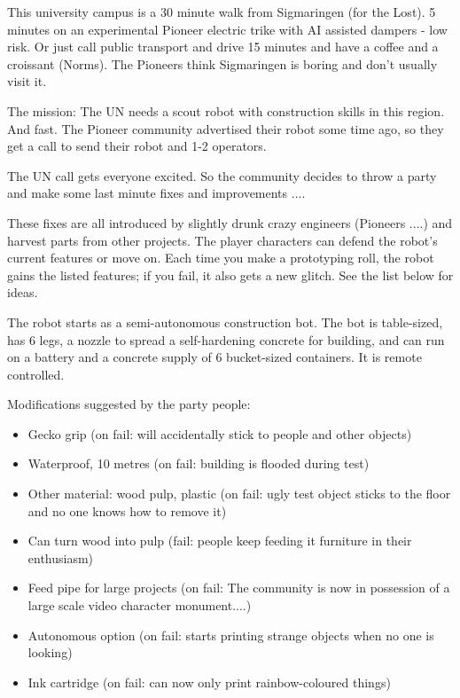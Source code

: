 This university campus is a 30 minute walk from Sigmaringen (for the Lost). 5 minutes on an experimental Pioneer electric trike with AI assisted dampers - low risk. Or just call public transport and drive 15 minutes and have a coffee and a croissant (Norms).
The Pioneers think Sigmaringen is boring and don't usually visit it.

The mission: The UN needs a scout robot with construction skills in this region. And fast. The Pioneer community advertised their robot some time ago, so they get a call to send their robot and 1-2 operators.

The UN call gets everyone excited. So the community decides to throw a party and make some last minute fixes and improvements ....

These fixes are all introduced by slightly drunk crazy engineers (Pioneers ....) and harvest parts from other projects. The player characters can defend the robot's current features or move on. Each time you make a prototyping roll, the robot gains the listed features; if you fail, it also gets a new glitch. See the list below for ideas.

The robot starts as a semi-autonomous construction bot. The bot is table-sized, has 6 legs, a nozzle to spread a self-hardening concrete for building, and can run on a battery and a concrete supply of 6 bucket-sized containers. It is remote controlled.

Modifications suggested by the party people:

\begin{itemize}
    \item Gecko grip (on fail: will accidentally stick to people and other objects)
    \item Waterproof, 10 metres (on fail: building is flooded during test)
    \item Other material: wood pulp, plastic (on fail: ugly test object sticks to the floor and no one knows how to remove it)
    \item Can turn wood into pulp (fail: people keep feeding it furniture in their enthusiasm)
    \item Feed pipe for large projects (on fail: The community is now in possession of a large scale video character monument....)
    \item Autonomous option (on fail: starts printing strange objects when no one is looking)
    \item Ink cartridge (on fail: can now only print rainbow-coloured things)
\end{itemize}

